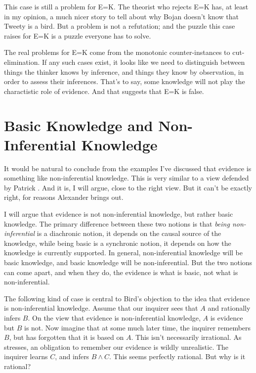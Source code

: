 \documentclass[11pt,]{book}
\begin{document}
This case is still a problem for E=K. The theorist who rejects E=K has, at least in my opinion, a much nicer story to tell about why Bojan doesn't know that Tweety is a bird. But a problem is not a refutation; and the puzzle this case raises for E=K is a puzzle everyone has to solve.

The real problems for E=K come from the monotonic counter-instances to cut-elimination. If any such cases exist, it looks like we need to distinguish between things the thinker knows by inference, and things they know by observation, in order to assess their inferences. That's to say, some knowledge will not play the charactistic role of evidence. And that suggests that E=K is false.

\hypertarget{basic}{%
\section{Basic Knowledge and Non-Inferential Knowledge}\label{basic}}

It would be natural to conclude from the examples I've discussed that evidence is something like non-inferential knowledge. This is very similar to a view defended by Patrick \citet{Maher1996}. And it is, I will argue, close to the right view. But it can't be exactly right, for reasons Alexander \citet{Bird2004} brings out.

I will argue that evidence is not non-inferential knowledge, but rather basic knowledge. The primary difference between these two notions is that \emph{being non-inferential} is a diachronic notion, it depends on the causal source of the knowledge, while being basic is a synchronic notion, it depends on how the knowledge is currently supported. In general, non-inferential knowledge will be basic knowledge, and basic knowledge will be non-inferential. But the two notions can come apart, and when they do, the evidence is what is basic, not what is non-inferential.

The following kind of case is central to Bird's objection to the idea that evidence is non-inferential knowledge. Assume that our inquirer sees that \(A\) and rationally infers \(B\). On the view that evidence is non-inferential knowledge, \(A\) is evidence but \(B\) is not. Now imagine that at some much later time, the inquirer remembers \(B\), but has forgotten that it is based on \(A\). This isn't necessarily irrational. As \citet{Harman1986} stresses, an obligation to remember our evidence is wildly unrealistic. The inquirer learns \(C\), and infers \(B \wedge C\). This seems perfectly rational. But why is it rational?
\end{document}
